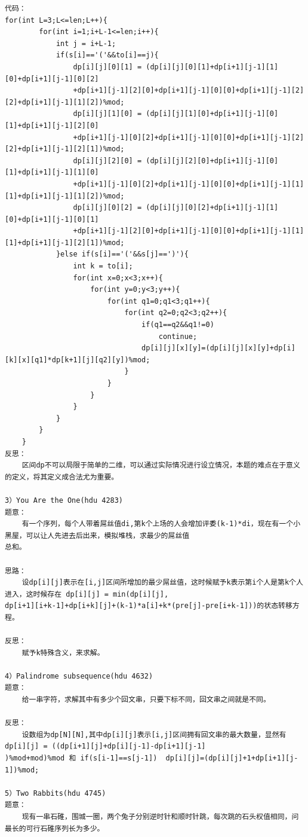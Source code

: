 \documentclass[twoside]{article}
\begin{document}
\begin{lstlisting}
代码：
for(int L=3;L<=len;L++){
        for(int i=1;i+L-1<=len;i++){
            int j = i+L-1;
            if(s[i]=='('&&to[i]==j){
                dp[i][j][0][1] = (dp[i][j][0][1]+dp[i+1][j-1][1][0]+dp[i+1][j-1][0][2]
                +dp[i+1][j-1][2][0]+dp[i+1][j-1][0][0]+dp[i+1][j-1][2][2]+dp[i+1][j-1][1][2])%mod;
                dp[i][j][1][0] = (dp[i][j][1][0]+dp[i+1][j-1][0][1]+dp[i+1][j-1][2][0]
                +dp[i+1][j-1][0][2]+dp[i+1][j-1][0][0]+dp[i+1][j-1][2][2]+dp[i+1][j-1][2][1])%mod;
                dp[i][j][2][0] = (dp[i][j][2][0]+dp[i+1][j-1][0][1]+dp[i+1][j-1][1][0]
                +dp[i+1][j-1][0][2]+dp[i+1][j-1][0][0]+dp[i+1][j-1][1][1]+dp[i+1][j-1][1][2])%mod;
                dp[i][j][0][2] = (dp[i][j][0][2]+dp[i+1][j-1][1][0]+dp[i+1][j-1][0][1]
                +dp[i+1][j-1][2][0]+dp[i+1][j-1][0][0]+dp[i+1][j-1][1][1]+dp[i+1][j-1][2][1])%mod;
            }else if(s[i]=='('&&s[j]==')'){
                int k = to[i];
                for(int x=0;x<3;x++){
                    for(int y=0;y<3;y++){
                        for(int q1=0;q1<3;q1++){
                            for(int q2=0;q2<3;q2++){
                                if(q1==q2&&q1!=0)
                                    continue;
                                dp[i][j][x][y]=(dp[i][j][x][y]+dp[i][k][x][q1]*dp[k+1][j][q2][y])%mod;
                            }
                        }
                    }
                }
            }
        }
    }
反思：
    区间dp不可以局限于简单的二维，可以通过实际情况进行设立情况，本题的难点在于意义的定义，将其定义成合法尤为重要。

3）You Are the One(hdu 4283)
题意：
    有一个序列，每个人带着屌丝值di,第k个上场的人会增加评委(k-1)*di，现在有一个小黑屋，可以让人先进去后出来，模拟堆栈，求最少的屌丝值
总和。

思路：
    设dp[i][j]表示在[i,j]区间所增加的最少屌丝值，这时候赋予k表示第i个人是第k个人进入，这时候存在 dp[i][j] = min(dp[i][j],
dp[i+1][i+k-1]+dp[i+k][j]+(k-1)*a[i]+k*(pre[j]-pre[i+k-1]))的状态转移方程。

反思：
    赋予k特殊含义，来求解。

4）Palindrome subsequence(hdu 4632)
题意：
    给一串字符，求解其中有多少个回文串，只要下标不同，回文串之间就是不同。

反思：
    设数组为dp[N][N],其中dp[i][j]表示[i,j]区间拥有回文串的最大数量，显然有dp[i][j] = ((dp[i+1][j]+dp[i][j-1]-dp[i+1][j-1]
)%mod+mod)%mod 和 if(s[i-1]==s[j-1])  dp[i][j]=(dp[i][j]+1+dp[i+1][j-1])%mod;

5）Two Rabbits(hdu 4745)
题意：
    现有一串石碓，围城一圈，两个兔子分别逆时针和顺时针跳，每次跳的石头权值相同，问最长的可行石碓序列长为多少。


\end{lstlisting}
\end{document}
